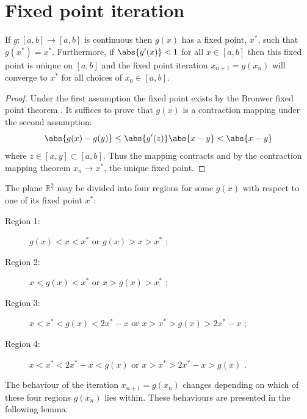 \documentclass{article}
\begin{document}
\section{Fixed point iteration}
\label{sec:fpi}

\begin{thm}
If $g:[a,b] \to [a,b]$ is continuous then $g(x)$ has a fixed point, $x^*$, such that $g(x^*) = x^*$.
Furthermore, if $\abs{g'(x)} < 1$ for all $x \in [a,b]$ then this fixed point is unique on $[a,b]$ and the fixed point iteration $x_{n+1} = g(x_n)$ will converge to $x^*$ for all choices of $x_0 \in [a,b]$.
\end{thm}

\begin{proof}
Under the first assumption the fixed point exists by the Brouwer fixed point theorem \cite{suli2003introduction}.
It suffices to prove that $g(x)$ is a contraction mapping \cite{suli2003introduction} under the second assumption:
\begin{equation*}
\abs{g(x) - g(y)} \leq \abs{g'(z)} \abs{x - y} < \abs{x-y}
\end{equation*}
where $z \in [x,y] \subset [a,b]$.
Thus the mapping contracts and by the contraction mapping theorem $x_n \to x^*$, the unique fixed point.
\end{proof}

The plane $\mathbb{R}^2$ may be divided into four regions for some $g(x)$ with respect to one of its fixed point $x^*$:
\begin{description}
\item[Region 1:] $g(x) < x < x^*$ or $g(x) > x > x^*$ ;
\item[Region 2:] $x < g(x) < x^*$ or $x > g(x) > x^*$ ;
\item[Region 3:] $x < x^* < g(x) < 2 x^* - x$ or $x > x^* > g(x) > 2 x^* - x$ ;
\item[Region 4:] $x < x^* < 2 x^* - x < g(x)$ or $x > x^* > 2 x^* - x > g(x)$ .
\end{description}
The behaviour of the iteration $x_{n+1} = g(x_n)$ changes depending on which of these four regions $g(x_n)$ lies within.
These behaviours are presented in the following lemma.
\end{document}
